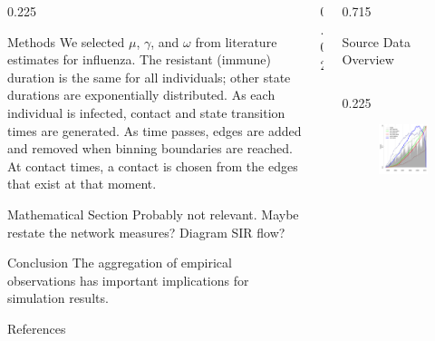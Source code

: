 \documentclass[final]{beamer} %
\newcommand{\spaceProp}{0.02}
\newcommand{\spacer}{\begin{column}{\spaceProp\paperwidth}\end{column}}
\newenvironment{oneCol}{\begin{column}[t]{0.225\paperwidth}}{\end{column}}
\newenvironment{threeCol}{\begin{column}[t]{0.715\paperwidth}}{\end{column}}
\begin{document}
\begin{frame}{}
\begin{columns}[t]
\begin{oneCol}
\begin{block}{Methods}
We selected $\mu$, $\gamma$, and $\omega$ from literature estimates for influenza.  The resistant (immune) duration is the same for all individuals; other state durations are exponentially distributed.  As each individual is infected, contact and state transition times are generated.  As time passes, edges are added and removed when binning boundaries are reached.  At contact times, a contact is chosen from the edges that exist at that moment. 
    \end{block}
    \begin{block}{Mathematical Section}
Probably not relevant.  Maybe restate the network measures?  Diagram SIR flow?
    \end{block}
    \begin{block}{Conclusion}
The aggregation of empirical observations has important implications for simulation results.
    \end{block}
    \begin{block}{References}
      \nocite{*} %
      \small{
      \vspace{0.75in}}
    \end{block}
    \end{oneCol}
    \spacer{}
    \begin{threeCol}
    \begin{block}{Source Data Overview}
    \begin{columns}
    \begin{oneCol}
      \begin{figure}
        \includegraphics[width=1.0\linewidth]{dataReview.png}

\end{figure}
\end{oneCol}
\end{columns}
\end{block}
\end{threeCol}
\end{columns}
\end{frame}
\end{document}
